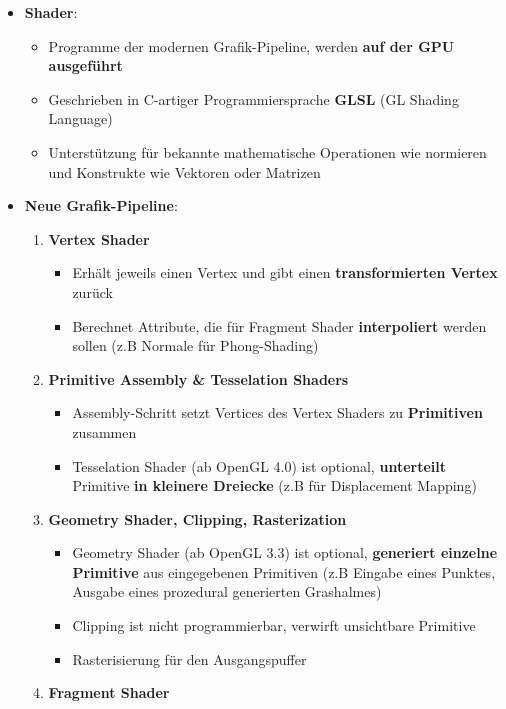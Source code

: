 \documentclass[10pt,a4paper]{article}
\begin{document}
\begin{itemize}
\begin{itemize}
		\end{itemize}
		\item \textbf{Shader}:
		\begin{itemize}
			\item Programme der modernen Grafik-Pipeline, werden \textbf{auf der GPU ausgeführt}
			\item Geschrieben in C-artiger Programmiersprache \textbf{GLSL} (GL Shading Language)
			\item Unterstützung für bekannte mathematische Operationen wie normieren und Konstrukte wie Vektoren oder Matrizen
		\end{itemize}
		\item \textbf{Neue Grafik-Pipeline}:
		\begin{enumerate}
			\item \textbf{Vertex Shader}
			\begin{itemize}
				\item Erhält jeweils einen Vertex und gibt einen \textbf{transformierten Vertex} zurück
				\item Berechnet Attribute, die für Fragment Shader \textbf{interpoliert} werden sollen (z.B Normale für Phong-Shading)
			\end{itemize}
			\item \textbf{Primitive Assembly \& Tesselation Shaders}
			\begin{itemize}
				\item Assembly-Schritt setzt Vertices des Vertex Shaders zu \textbf{Primitiven} zusammen
				\item Tesselation Shader (ab OpenGL 4.0) ist optional, \textbf{unterteilt} Primitive \textbf{in kleinere Dreiecke} (z.B für Displacement Mapping)
			\end{itemize}
			\item \textbf{Geometry Shader, Clipping, Rasterization}
			\begin{itemize}
				\item Geometry Shader (ab OpenGL 3.3) ist optional, \textbf{generiert einzelne Primitive} aus eingegebenen Primitiven (z.B Eingabe eines Punktes, Ausgabe eines prozedural generierten Grashalmes)
				\item Clipping ist nicht programmierbar, verwirft unsichtbare Primitive
				\item Rasterisierung für den Ausgangspuffer
			\end{itemize}
			\item \textbf{Fragment Shader}
			\begin{itemize}

\end{itemize}
\end{enumerate}
\end{itemize}
\end{document}
